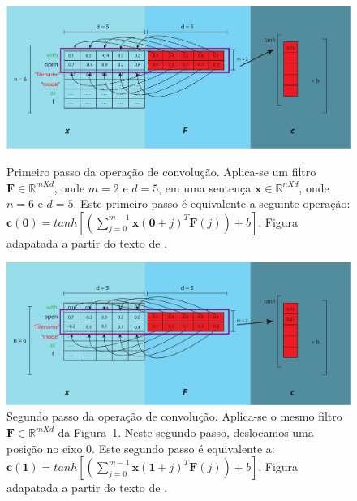 \begin{figure}[h]
    \centering
    \caption[Primeiro passo da operação de convolução.]{Primeiro passo da operação de convolução. Aplica-se um filtro $\bm{F} \in \mathbb{R}^{m X d}$, onde $m = 2$ e $d = 5$, em uma sentença $\bm{x} \in \mathbb{R}^{n X d}$, onde $n = 6$ e $d = 5$. Este primeiro passo é equivalente a seguinte operação: $\bm{c}(\bm{0}) = tanh \left[\left(\sum_{j=0}^{m - 1} \bm{x}(\bm{0} + j)^{T}\bm{F}(j)\right) + b\right]$. Figura adapatada a partir do texto de .}
    \includegraphics[width=1\textwidth]{figuras/cap-problema/first-step-convolution.pdf}
    \label{fig:first-step-convolutional}
\end{figure}

\begin{figure}[h]
    \centering
    \caption[Segundo passo da operação de convolução.]{Segundo passo da operação de convolução. Aplica-se o mesmo filtro $\bm{F} \in \mathbb{R}^{m X d}$ da Figura~\ref{fig:first-step-convolutional}. Neste segundo passo, deslocamos uma posição no eixo $0$. Este segundo passo é equivalente a: $\bm{c}(\bm{1}) = tanh [(\sum_{j=0}^{m - 1} \bm{x}(\bm{1} + j)^{T}\bm{F}(j)) + b]$. Figura adapatada a partir do texto de .}
    \label{fig:second-step-convolutional}
    \includegraphics[width=1\textwidth]{figuras/cap-problema/second-step-convolution.pdf}
\end{figure}


